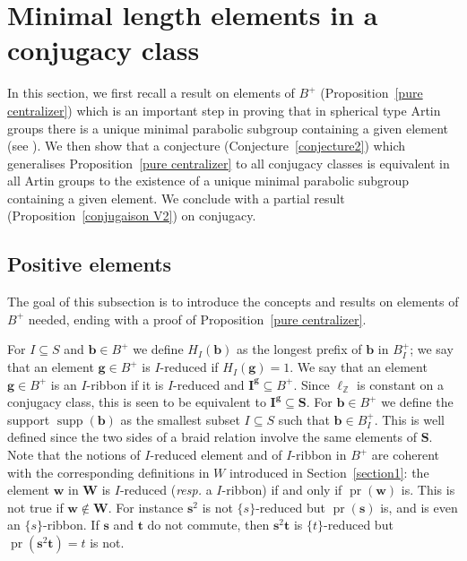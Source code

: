 \documentclass{amsart}
\numberwithin{equation}{section}
\newcommand\lZ{{\ell_{\BZ}}}
\newcommand\bb{{\mathbf b}}
\newcommand\bg{{\mathbf g}}
\newcommand\bs{{\mathbf s}}
\newcommand\bt{{\mathbf t}}
\newcommand\bw{{\mathbf w}}
\newcommand\bI{{\mathbf I}}
\newcommand\bS{{\mathbf S}}
\newcommand\bW{{\mathbf W}}
\newcommand\BZ{{\mathbb Z}}
\DeclareMathOperator\pr{pr}
\DeclareMathOperator\supp{supp}
\begin{document}
\section{Minimal length  elements in a conjugacy class}\label{conjectures}
In this section, we first recall a result on elements of $B^+$ 
(Proposition~\ref{pure  centralizer})  which  is  an  important  step in proving that in
spherical type Artin  groups  there  is  a  unique  minimal  parabolic subgroup
containing  a given  element (see \cite[Introduction of section 6]{CumplidoetAll}).
We  then show  that a  conjecture (Conjecture~\ref{conjecture2})  
which generalises Proposition~\ref{pure centralizer} to
all conjugacy classes is equivalent in all Artin groups to the existence of
a unique minimal parabolic subgroup containing a given element. 
We conclude with a partial result (Proposition~\ref{conjugaison V2})
on conjugacy. 

\subsection*{Positive elements}
The  goal of this  subsection is to  introduce the concepts  and results on
elements  of $B^+$  needed, ending  with a  proof of  Proposition~\ref{pure
centralizer}.

For  $I\subseteq S$ and $\bb\in B^+$ we define $H_I(\bb)$ 
as  the longest prefix of $\bb$ in  $B^+_I$; we say that an element $\bg\in
B^+$  is $I$-reduced  if  $H_I(\bg)=1$. We say that
an  element~$\bg\in  B^+$  is  an  $I$-ribbon  if  it  is  $I$-reduced and
$\bI^\bg\subseteq  B^+$. Since $\lZ$ is  constant on a conjugacy class, this
is seen to be equivalent to $\bI^\bg\subseteq\bS$. For $\bb\in B^+$ we define
the  support  $\supp(\bb)$  \index{supp@$\supp$}  as  the  smallest  subset
$I\subseteq S$ such that $\bb\in B_I^+$. This  is well defined since the two
sides  of a  braid relation  involve the  same elements  of $\bS$. Note that
the notions  of $I$-reduced element and of  $I$-ribbon in $B^+$ are
coherent   with  the   corresponding  definitions  in  $W$  introduced  in
Section~\ref{section1}:   the  element   $\bw$  in   $\bW$  is  $I$-reduced
(\emph{resp.}  a $I$-ribbon) if and only if $\pr(\bw)$ is. This is not true
if $\bw\notin\bW$. For instance  $\bs^2$ is not  $\{s\}$-reduced but 
$\pr(\bs)$ is, and  is  even  an $\{s\}$-ribbon.  If  $\bs$  and $\bt$ do
not commute, then
$\bs^2\bt$ is $\{t\}$-reduced but $\pr(\bs^2\bt)= t$ is not.
\end{document}
